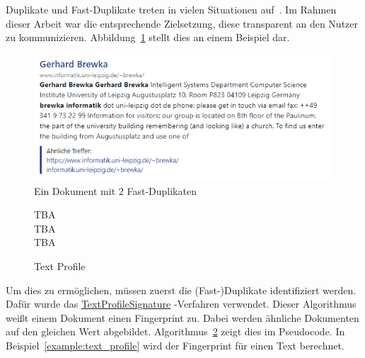 Duplikate und Fast-Duplikate treten in vielen Situationen auf~\cite{croft.chap3}.
Im Rahmen dieser Arbeit war die entsprechende Zielsetzung, diese transparent an den Nutzer zu kommunizieren.
Abbildung~\ref{fig:grouped_sim} stellt dies an einem Beispiel dar.

\begin{figure}[!ht]
	\includegraphics[width=0.99\textwidth]{chapter_data_aqcuisition/grouped_duplicates.png}
	\caption{Ein Dokument mit 2 Fast-Duplikaten}
	\label{fig:grouped_sim}
\end{figure}

\begin{figure}
	\vspace*{-0.4cm}

\begin{scriptsize}
\begin{algorithm}[H]
		       

	TBA\\
	TBA\\
	TBA\\
	\caption{Text Profile}
	\label{alg:text_profile}
\end{algorithm}
\end{scriptsize}

	\vspace*{-0.2cm}
\end{figure}

Um dies zu ermöglichen, müssen zuerst die (Fast-)Duplikate identifiziert werden.
Dafür wurde das
\href{https://github.com/apache/nutch/blob/master/src/java/org/apache/nutch/crawl/TextProfileSignature.java}{TextProfileSignature}
-Verfahren verwendet.
Dieser Algorithmus weißt einem Dokument einen Fingerprint zu.
Dabei werden ähnliche Dokumenten auf den gleichen Wert abgebildet.
Algorithmus~\ref{alg:text_profile} zeigt dies im Pseudocode.
In Beispiel~\ref{example:text_profile} wird der Fingerprint für einen Text berechnet.

